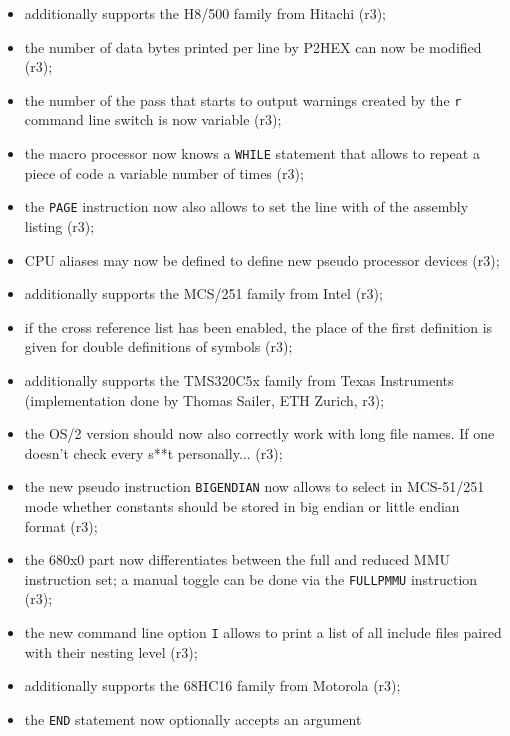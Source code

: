 \documentclass[12pt,twoside]{report}
\newcommand{\tty}[1]{{\tt #1}}
\begin{document}
\begin{itemize}
{\begin{itemize}
{            (r2);}
      \item{additionally supports the H8/500 family from Hitachi
            (r3);}
      \item{the number of data bytes printed per line by P2HEX
            can now be modified (r3);}
      \item{the number of the pass that starts to output warnings
            created by the \tty{r} command line switch is now variable
            (r3);}
      \item{the macro processor now knows a \tty{WHILE} statement that
            allows to repeat a piece of code a variable number of
            times (r3);}
      \item{the \tty{PAGE} instruction now also allows to set the line
            with of the assembly listing (r3);}
      \item{CPU aliases may now be defined to define new pseudo
            processor devices (r3);}
      \item{additionally supports the MCS/251 family from Intel
            (r3);}
      \item{if the cross reference list has been enabled, the
            place of the first definition is given for double
            definitions of symbols (r3);}
      \item{additionally supports the TMS320C5x family from Texas
            Instruments (implementation done by Thomas Sailer,
            ETH Zurich, r3);}
      \item{the OS/2 version should now also correctly work with
            long file names.  If one doesn't check every s**t 
            personally... (r3);}
      \item{the new pseudo instruction \tty{BIGENDIAN} now allows to
            select in MCS-51/251 mode whether constants should
            be stored in big endian or little endian format (r3);}
      \item{the 680x0 part now differentiates between the full
            and reduced MMU instruction set; a manual toggle can
            be done via the \tty{FULLPMMU} instruction (r3);}
      \item{the new command line option \tty{I} allows to print a list
            of all include files paired with their nesting level
            (r3);}
      \item{additionally supports the 68HC16 family from Motorola
            (r3);}
      \item{the \tty{END} statement now optionally accepts an argument
}
\end{itemize}}
\end{itemize}
\end{document}
